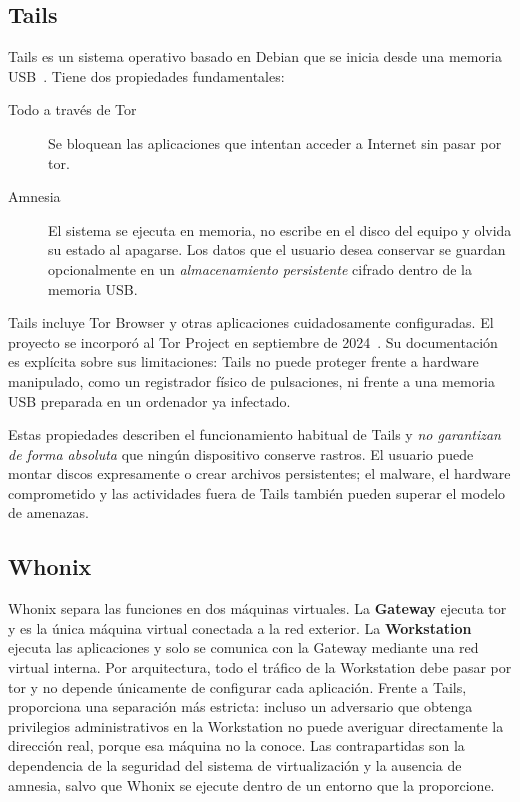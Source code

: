 \subsection{Tails}

Tails es un sistema operativo basado en Debian que se inicia desde una memoria USB~\cite{tailsabout}. Tiene dos propiedades fundamentales:
\begin{description}
  \item[Todo a través de Tor] Se bloquean las aplicaciones que intentan acceder a Internet sin pasar por tor.
  \item[Amnesia] El sistema se ejecuta en memoria, no escribe en el disco del equipo y olvida su estado al apagarse. Los datos que el usuario desea conservar se guardan opcionalmente en un \emph{almacenamiento persistente} cifrado dentro de la memoria USB.
\end{description}

Tails incluye Tor Browser y otras aplicaciones cuidadosamente configuradas. El proyecto se incorporó al Tor Project en septiembre de 2024~\cite{torblogtails}. Su documentación es explícita sobre sus limitaciones: Tails no puede proteger frente a hardware manipulado, como un registrador físico de pulsaciones, ni frente a una memoria USB preparada en un ordenador ya infectado.

Estas propiedades describen el funcionamiento habitual de Tails y \emph{no garantizan de forma absoluta} que ningún dispositivo conserve rastros. El usuario puede montar discos expresamente o crear archivos persistentes; el malware, el hardware comprometido y las actividades fuera de Tails también pueden superar el modelo de amenazas.

\subsection{Whonix}

Whonix separa las funciones en dos máquinas virtuales. La \textbf{Gateway} ejecuta tor y es la única máquina virtual conectada a la red exterior. La \textbf{Workstation} ejecuta las aplicaciones y solo se comunica con la Gateway mediante una red virtual interna. Por arquitectura, todo el tráfico de la Workstation debe pasar por tor y no depende únicamente de configurar cada aplicación. Frente a Tails, proporciona una separación más estricta: incluso un adversario que obtenga privilegios administrativos en la Workstation no puede averiguar directamente la dirección real, porque esa máquina no la conoce. Las contrapartidas son la dependencia de la seguridad del sistema de virtualización y la ausencia de amnesia, salvo que Whonix se ejecute dentro de un entorno que la proporcione.

